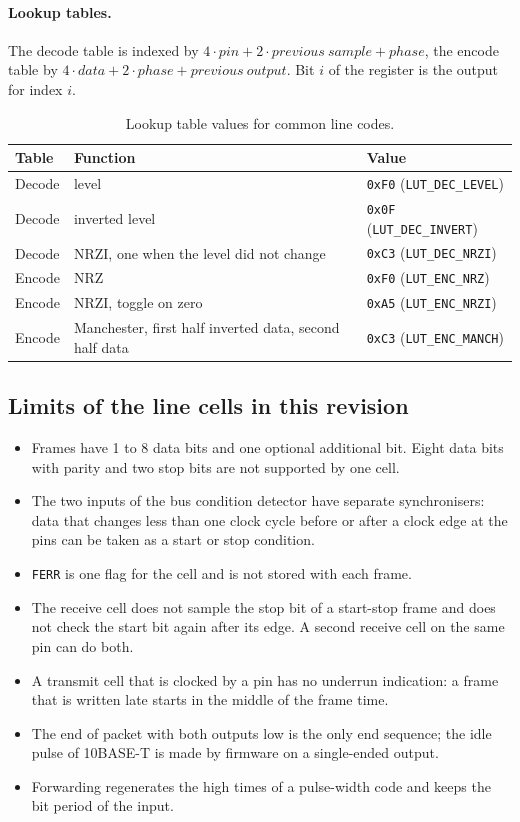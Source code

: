 \documentclass[10pt,a4paper]{article}
\newcommand{\reg}[1]{\texttt{#1}}
\begin{document}
\paragraph{Lookup tables.} The decode table is indexed by $4\cdot\mathit{pin} + 2\cdot\mathit{previous\ sample} +
\mathit{phase}$, the encode table by $4\cdot\mathit{data} + 2\cdot\mathit{phase} + \mathit{previous\ output}$.
Bit $i$ of the register is the output for index $i$.

\begin{table}[H]
\centering\small
\begin{tabular}{@{}lll@{}}
\toprule
Table & Function & Value \\
\midrule
Decode & level & \texttt{0xF0} (\texttt{LUT\_DEC\_LEVEL}) \\
Decode & inverted level & \texttt{0x0F} (\texttt{LUT\_DEC\_INVERT}) \\
Decode & NRZI, one when the level did not change & \texttt{0xC3} (\texttt{LUT\_DEC\_NRZI}) \\
Encode & NRZ & \texttt{0xF0} (\texttt{LUT\_ENC\_NRZ}) \\
Encode & NRZI, toggle on zero & \texttt{0xA5} (\texttt{LUT\_ENC\_NRZI}) \\
Encode & Manchester, first half inverted data, second half data & \texttt{0xC3} (\texttt{LUT\_ENC\_MANCH}) \\
\bottomrule
\end{tabular}
\caption{Lookup table values for common line codes.}
\end{table}


\subsection{Limits of the line cells in this revision}

\begin{itemize}
\item Frames have 1 to 8 data bits and one optional additional bit. Eight data bits with parity and two stop bits are not supported by one cell.
\item The two inputs of the bus condition detector have separate synchronisers: data that changes less than one clock cycle before or after a clock edge at the pins can be taken as a start or stop condition.
\item \reg{FERR} is one flag for the cell and is not stored with each frame.
\item The receive cell does not sample the stop bit of a start-stop frame and does not check the start bit
again after its edge. A second receive cell on the same pin can do both.
\item A transmit cell that is clocked by a pin has no underrun indication: a frame that is written late starts
in the middle of the frame time.
\item The end of packet with both outputs low is the only end sequence; the idle pulse of 10BASE-T is made by
firmware on a single-ended output.
\item Forwarding regenerates the high times of a pulse-width code and keeps the bit period of the input.
\end{itemize}
\end{document}
